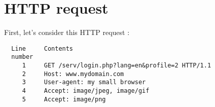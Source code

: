 
\section{HTTP request}

First, let's consider this HTTP request :

\begin{verbatim}
  Line     Contents
  number
     1     GET /serv/login.php?lang=en&profile=2 HTTP/1.1
     2     Host: www.mydomain.com
     3     User-agent: my small browser
     4     Accept: image/jpeg, image/gif
     5     Accept: image/png
\end{verbatim}

